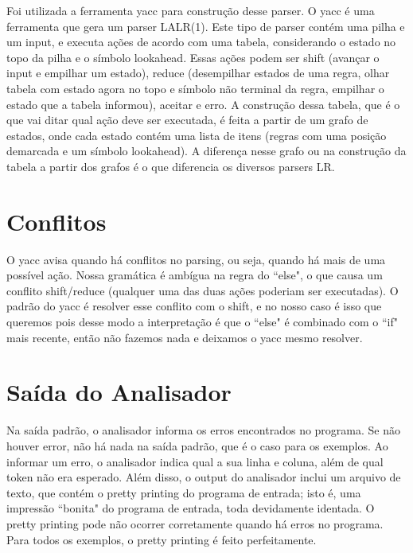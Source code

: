 Foi utilizada a ferramenta yacc para construção desse parser. O yacc é uma ferramenta que gera um parser LALR(1). Este tipo de parser contém uma pilha e um input, e executa ações de acordo com uma tabela, considerando o estado no topo da pilha e o símbolo lookahead. Essas ações podem ser shift (avançar o input e empilhar um estado), reduce (desempilhar estados de uma regra, olhar tabela com estado agora no topo e símbolo não terminal da regra, empilhar o estado que a tabela informou), aceitar e erro. A construção dessa tabela, que é o que vai ditar qual ação deve ser executada, é feita a partir de um grafo de estados, onde cada estado contém uma lista de itens (regras com uma posição demarcada e um símbolo lookahead). A diferença nesse grafo ou na construção da tabela a partir dos grafos é o que diferencia os diversos parsers LR.

\section{Conflitos}
O yacc avisa quando há conflitos no parsing, ou seja, quando há mais de uma possível ação. Nossa gramática é ambígua na regra do ``else", o que causa um conflito shift/reduce (qualquer uma das duas ações poderiam ser executadas). O padrão do yacc é resolver esse conflito com o shift, e no nosso caso é isso que queremos pois desse modo a interpretação é que o ``else" é combinado com o ``if" mais recente, então não fazemos nada e deixamos o yacc mesmo resolver.

\section{Saída do Analisador}
Na saída padrão, o analisador informa os erros encontrados no programa. Se não houver error, não há nada na saída padrão, que é o caso para os exemplos. Ao informar um erro, o analisador indica qual a sua linha e coluna, além de qual token não era esperado.
Além disso, o output do analisador inclui um arquivo de texto, que contém o pretty printing do programa de entrada; isto é, uma impressão ``bonita" do programa de entrada, toda devidamente identada. O pretty printing pode não ocorrer corretamente quando há erros no programa. Para todos os exemplos, o pretty printing é feito perfeitamente.


